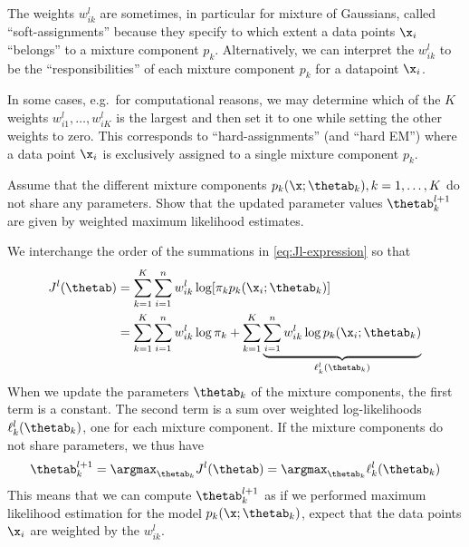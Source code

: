 \begin{exenumerate}
\begin{solution}
    The weights $w_{ik}^l$ are sometimes, in particular for mixture of
    Gaussians, called ``soft-assignments'' because they specify to which extent
    a data points $\x_i$ ``belongs'' to a mixture component $p_k$.
    Alternatively, we can interpret the $w_{ik}^l$ to be the
    ``responsibilities'' of each mixture component $p_k$ for a datapoint $\x_i$.

    In some cases, e.g.\ for computational reasons, we may determine which of
    the $K$ weights $w_{i1}^l, \ldots, w_{iK}^l$ is the largest and then set it
    to one while setting the other weights to zero. This corresponds to
    ``hard-assignments'' (and ``hard EM'') where a data point $\x_i$ is
    exclusively assigned to a single mixture component $p_k$. 
  \end{solution}

\item Assume that the different mixture components $p_k(\x; \thetab_k), k=1,
  \ldots, K$ do not share any parameters. Show that the updated parameter values
  $\thetab_k^{l+1}$ are given by weighted maximum likelihood estimates.

  \begin{solution}
   We interchange the order of the summations in \eqref{eq:Jl-expression} so
   that
   \begin{align}
     J^l(\thetab) & = \sum_{k=1}^K \sum_{i=1}^n  w_{ik}^l  \log[  \pi_k  p_k(\x_i; \thetab_k) ]\\
                  & =  \sum_{k=1}^K\sum_{i=1}^n  w_{ik}^l\log \pi_k + \sum_{k=1}^K\underbrace{\sum_{i=1}^n  w_{ik}^l \log p_k(\x_i; \thetab_k)}_{\ell_k^l(\thetab_k)}
                    \label{eq:Jl-interchanged}
   \end{align}
   When we update the parameters $\thetab_k$ of the mixture components, the
   first term is a constant. The second term is a sum over weighted
   log-likelihoods $\ell_k^l(\thetab_k)$, one for each mixture component. If the
   mixture components do not share parameters, we thus have
   \begin{equation}
     \thetab_k^{l+1} =  \argmax_{\thetab_k}  J^l(\thetab) = \argmax_{\thetab_k} \ell_k^l(\thetab_k)
   \end{equation}
   This means that we can compute $\thetab_k^{l+1}$ as if we performed maximum
   likelihood estimation for the model $p_k(\x; \thetab_k)$, expect that
   the data points $\x_i$ are weighted by the $w_{ik}^l$.
  \end{solution}


\end{exenumerate}
